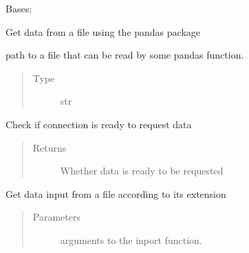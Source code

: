 \documentclass[letterpaper,10pt,english]{sphinxmanual}
\begin{document}
\begin{fulllineitems}
\label{\detokenize{dalio.external:dalio.external.PandasInFile}}
Bases: {\hyperref[\detokenize{dalio.external:dalio.external.external.External}]{}}

Get data from a file using the pandas package

\begin{fulllineitems}
\label{\detokenize{dalio.external:dalio.external.PandasInFile._connection}}
path to a file that can be read by some pandas
function.
\begin{quote}\begin{description}
\item[{Type}] \leavevmode
str

\end{description}\end{quote}

\end{fulllineitems}


\begin{fulllineitems}
\label{\detokenize{dalio.external:dalio.external.PandasInFile.check}}
Check if connection is ready to request data
\begin{quote}\begin{description}
\item[{Returns}] \leavevmode
Whether data is ready to be requested

\end{description}\end{quote}

\end{fulllineitems}


\begin{fulllineitems}
\label{\detokenize{dalio.external:dalio.external.PandasInFile.request}}
Get data input from a file according to its extension
\begin{quote}\begin{description}
\item[{Parameters}] \leavevmode
{} \textendash{} arguments to the inport function.


\end{description}
\end{quote}
\end{fulllineitems}
\end{fulllineitems}
\end{document}

